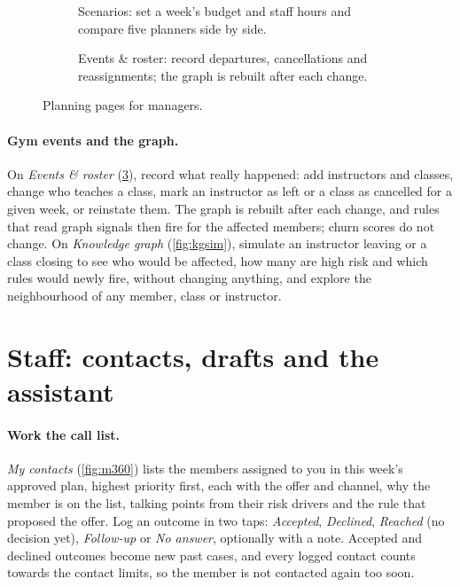 \begin{figure}[tb]
  \centering
  \begin{subfigure}[t]{0.495\linewidth}
    \caption{Scenarios: set a week's budget and staff hours and compare five planners side by side.}
    \label{fig:ug-scen}
  \end{subfigure}\hfill
  \begin{subfigure}[t]{0.495\linewidth}
    \caption{Events \& roster: record departures, cancellations and reassignments; the graph is rebuilt after each change.}
    \label{fig:ug-roster}
  \end{subfigure}
  \caption{Planning pages for managers.}
\end{figure}

\paragraph{Gym events and the graph.} On \emph{Events \& roster} (\cref{fig:ug-roster}), record what really happened: add instructors and classes, change who teaches a class, mark an instructor as left or a class as cancelled for a given week, or reinstate them. The graph is rebuilt after each change, and rules that read graph signals then fire for the affected members; churn scores do not change. On \emph{Knowledge graph} (\cref{fig:kgsim}), simulate an instructor leaving or a class closing to see who would be affected, how many are high risk and which rules would newly fire, without changing anything, and explore the neighbourhood of any member, class or instructor.

\section{Staff: contacts, drafts and the assistant}

\paragraph{Work the call list.} \emph{My contacts} (\cref{fig:m360}) lists the members assigned to you in this week's approved plan, highest priority first, each with the offer and channel, why the member is on the list, talking points from their risk drivers and the rule that proposed the offer. Log an outcome in two taps: \emph{Accepted}, \emph{Declined}, \emph{Reached} (no decision yet), \emph{Follow-up} or \emph{No answer}, optionally with a note. Accepted and declined outcomes become new past cases, and every logged contact counts towards the contact limits, so the member is not contacted again too soon.

